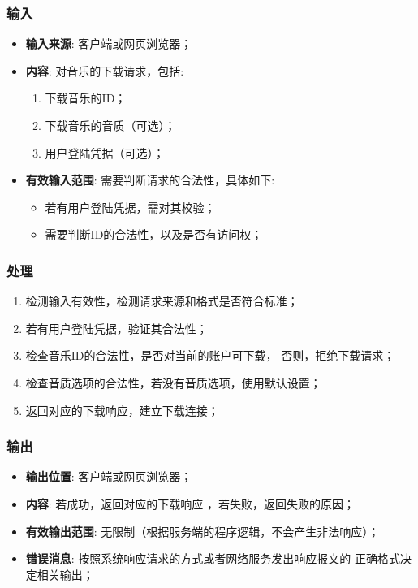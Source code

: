 \subsubsection{输入}
	\begin{itemize}
		\item \textbf{输入来源}: 客户端或网页浏览器；
		\item \textbf{内容}: 对音乐的下载请求，包括: 
		\begin{enumerate}
			\item 下载音乐的ID；
			\item 下载音乐的音质（可选）；
			\item 用户登陆凭据（可选）；
		\end{enumerate}
		\item \textbf{有效输入范围}: 需要判断请求的合法性，具体如下: 
		\begin{itemize}
			\item 若有用户登陆凭据，需对其校验； 
			\item 需要判断ID的合法性，以及是否有访问权；
		\end{itemize}
	\end{itemize}
\subsubsection{处理}
	\begin{enumerate}
		\item 检测输入有效性，检测请求来源和格式是否符合标准；
		\item 若有用户登陆凭据，验证其合法性；
		\item 检查音乐ID的合法性，是否对当前的账户可下载，
			否则，拒绝下载请求；
		\item 检查音质选项的合法性，若没有音质选项，使用默认设置；
		\item 返回对应的下载响应，建立下载连接；
	\end{enumerate}
\subsubsection{输出}
\begin{itemize}
	\item \textbf{输出位置}: 客户端或网页浏览器；
	\item \textbf{内容}: 若成功，返回对应的下载响应 ，若失败，返回失败的原因；
	\item \textbf{有效输出范围}: 无限制（根据服务端的程序逻辑，不会产生非法响应）；
	\item \textbf{错误消息}: 按照系统响应请求的方式或者网络服务发出响应报文的
		正确格式决定相关输出；
\end{itemize}

